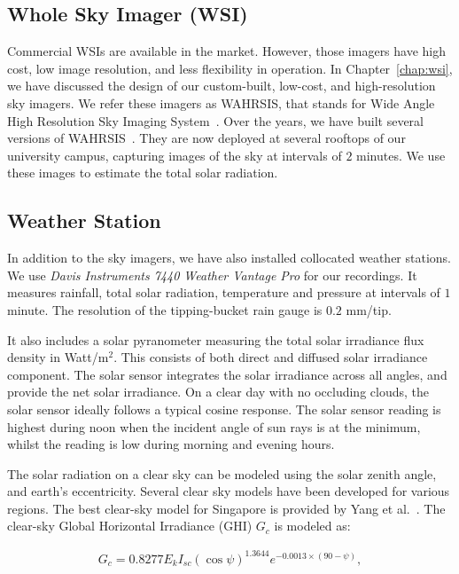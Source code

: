 \subsection{Whole Sky Imager (WSI)}
Commercial WSIs are available in the market. However, those imagers have high cost, low image resolution, and less flexibility in operation. In Chapter~\ref{chap:wsi}, we have discussed the design of our custom-built, low-cost, and high-resolution sky imagers. We refer these imagers as WAHRSIS, that stands for Wide Angle High Resolution Sky Imaging System~\cite{WAHRSIS}. Over the years, we have built several versions of WAHRSIS~\cite{WAHRSIS,IGARSS2015a}. They are now deployed at several rooftops of our university campus, capturing images of the sky at intervals of $2$ minutes. We use these images to estimate the total solar radiation. 

\subsection{Weather Station}
In addition to the sky imagers, we have also installed collocated weather stations. We use \emph{Davis Instruments 7440 Weather Vantage Pro} for our recordings. It measures rainfall, total solar radiation, temperature and pressure at intervals of $1$ minute. The resolution of the tipping-bucket rain gauge is $0.2$ mm/tip.

It also includes a solar pyranometer measuring the total solar irradiance flux density in Watt/$\mbox{m}^2$. This consists of both direct and diffused solar irradiance component. The solar sensor integrates the solar irradiance across all angles, and provide the net solar irradiance. On a clear day with no occluding clouds, the solar sensor ideally follows a typical cosine response. The solar sensor reading is highest during noon when the incident angle of sun rays is at the minimum, whilst the reading is low during morning and evening hours.

The solar radiation on a clear sky can be modeled using the solar zenith angle, and earth's eccentricity. Several clear sky models have been developed for various regions. The best clear-sky model for Singapore is provided by Yang et al.\ \cite{dazhi2012estimation}. The clear-sky Global Horizontal Irradiance (GHI) $G_c$ is modeled as: 

\begin{align}
G_c = 0.8277E_{k}I_{sc}(\cos\psi)^{1.3644}e^{-0.0013\times(90-\psi)},
\end{align}

